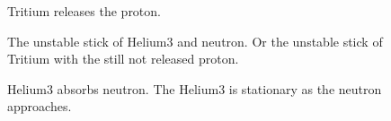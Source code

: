 


\begin{figure}
\begin{tikzpicture}[scale=0.5, rotate=0]

\end{tikzpicture}
\caption{Tritium releases the proton.
\label{Fig:Helium3_becomes_Tritium}}
\end{figure}




\begin{figure}
\begin{tikzpicture}[scale=0.5, rotate=0]

\end{tikzpicture}
\caption{The unstable stick of Helium3 and neutron. Or the unstable stick of Tritium with the still not released proton.
\label{Fig:Helium3_unstable_4_stick}}
\end{figure}




\begin{figure}
\begin{tikzpicture}[scale=0.5, rotate=0]

\end{tikzpicture}
\caption{Helium3 absorbs neutron. The Helium3 is stationary as the neutron approaches.
\label{Fig:Helium3_Absorbs_Neutron}}
\end{figure}


